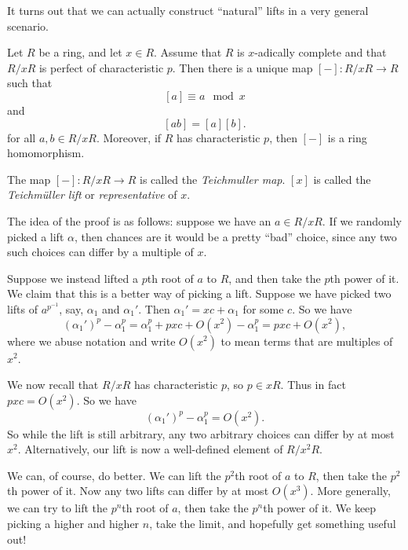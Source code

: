 \documentclass[a4paper]{article}
\begin{document}
It turns out that we can actually construct ``natural'' lifts in a very general scenario.
\begin{lemma}
  Let $R$ be a ring, and let $x \in R$. Assume that $R$ is $x$-adically complete and that $R/xR$ is perfect of characteristic $p$. Then there is a unique map $[-]: R/xR \to R$ such that
  \[
    [a] \equiv a \mod x
  \]
  and
  \[
    [ab] = [a][b].
  \]
  for all $a, b \in R/xR$. Moreover, if $R$ has characteristic $p$, then $[-]$ is a ring homomorphism.
\end{lemma}

\begin{defi}
  The map $[-]: R/xR \to R$ is called the \emph{Teichm\:uller map}. $[x]$ is called the \emph{Teichm\"uller lift} or \emph{representative} of $x$.
\end{defi}

The idea of the proof is as follows: suppose we have an $a \in R/xR$. If we randomly picked a lift $\alpha$, then chances are it would be a pretty ``bad'' choice, since any two such choices can differ by a multiple of $x$.

Suppose we instead lifted a $p$th root of $a$ to $R$, and then take the $p$th power of it. We claim that this is a better way of picking a lift. Suppose we have picked two lifts of $a^{p^{-1}}$, say, $\alpha_1$ and $\alpha_1'$. Then $\alpha_1' = xc + \alpha_1$ for some $c$. So we have
\[
  (\alpha_1')^p - \alpha_1^p = \alpha_1^p + pxc + O(x^2) - \alpha_1^p = pxc + O(x^2),
\]
where we abuse notation and write $O(x^2)$ to mean terms that are multiples of $x^2$.

We now recall that $R/xR$ has characteristic $p$, so $p \in xR$. Thus in fact $pxc = O(x^2)$. So we have
\[
  (\alpha_1')^p - \alpha_1^p = O(x^2).
\]
So while the lift is still arbitrary, any two arbitrary choices can differ by at most $x^2$. Alternatively, our lift is now a well-defined element of $R/x^2 R$.

We can, of course, do better. We can lift the $p^2$th root of $a$ to $R$, then take the $p^2$th power of it. Now any two lifts can differ by at most $O(x^3)$. More generally, we can try to lift the $p^n$th root of $a$, then take the $p^n$th power of it. We keep picking a higher and higher $n$, take the limit, and hopefully get something useful out!
\end{document}
